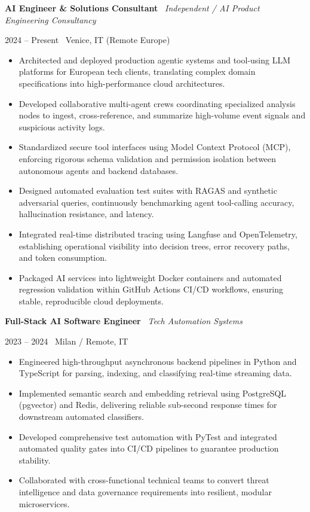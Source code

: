 \documentclass[a4paper,10pt]{article}
\newcommand{\role}[4]{%
  \vspace{2pt}\noindent
  \begin{minipage}[t]{0.70\textwidth}\raggedright\textbf{#1} \textbullet\ \textit{#3}\end{minipage}%
  \hfill
  \begin{minipage}[t]{0.28\textwidth}\raggedleft\footnotesize\color{gray}#2 \textbullet\ #4\end{minipage}%
  \vspace{1pt}%
}
\begin{document}
\role{AI Engineer \& Solutions Consultant}{2024 -- Present}{Independent / AI Product Engineering Consultancy}{Venice, IT (Remote Europe)}
\begin{itemize}
  \item Architected and deployed production agentic systems and tool-using LLM platforms for European tech clients, translating complex domain specifications into high-performance cloud architectures.
  \item Developed collaborative multi-agent crews coordinating specialized analysis nodes to ingest, cross-reference, and summarize high-volume event signals and suspicious activity logs.
  \item Standardized secure tool interfaces using Model Context Protocol (MCP), enforcing rigorous schema validation and permission isolation between autonomous agents and backend databases.
  \item Designed automated evaluation test suites with RAGAS and synthetic adversarial queries, continuously benchmarking agent tool-calling accuracy, hallucination resistance, and latency.
  \item Integrated real-time distributed tracing using Langfuse and OpenTelemetry, establishing operational visibility into decision trees, error recovery paths, and token consumption.
  \item Packaged AI services into lightweight Docker containers and automated regression validation within GitHub Actions CI/CD workflows, ensuring stable, reproducible cloud deployments.
\end{itemize}

\vspace{3pt}
\role{Full-Stack AI Software Engineer}{2023 -- 2024}{Tech Automation Systems}{Milan / Remote, IT}
\begin{itemize}
  \item Engineered high-throughput asynchronous backend pipelines in Python and TypeScript for parsing, indexing, and classifying real-time streaming data.
  \item Implemented semantic search and embedding retrieval using PostgreSQL (pgvector) and Redis, delivering reliable sub-second response times for downstream automated classifiers.
  \item Developed comprehensive test automation with PyTest and integrated automated quality gates into CI/CD pipelines to guarantee production stability.
  \item Collaborated with cross-functional technical teams to convert threat intelligence and data governance requirements into resilient, modular microservices.
\end{itemize}
\end{document}
